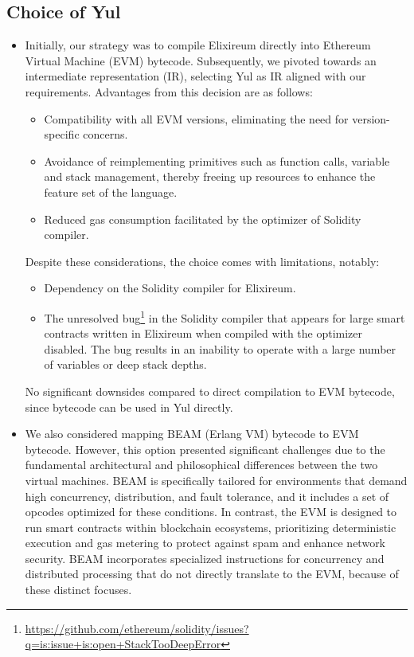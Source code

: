 \subsection{Choice of Yul}
\begin{itemize}
    \item Initially, our strategy was to compile Elixireum directly into Ethereum Virtual Machine (EVM) bytecode. Subsequently, we pivoted towards an intermediate representation (IR), selecting Yul as IR aligned with our requirements. Advantages from this decision are as follows:
        \begin{itemize}
            \item Compatibility with all EVM versions, eliminating the need for version-specific concerns. 
            \item Avoidance of reimplementing primitives such as function calls, variable and stack management, thereby freeing up resources to enhance the feature set of the language.
            \item Reduced gas consumption facilitated by the optimizer of Solidity compiler.
        \end{itemize}
      Despite these considerations, the choice comes with limitations, notably:
        \begin{itemize}
            \item Dependency on the Solidity compiler for Elixireum.
            \item The unresolved bug\footnote{\href{https://github.com/ethereum/solidity/issues?q=is:issue+is:open+StackTooDeepError}{https://github.com/ethereum/solidity/issues?q=is:issue+is:open+StackTooDeepError}} in the Solidity compiler that appears for large smart contracts written in Elixireum when compiled with the optimizer disabled. The bug results in an inability to operate with a large number of variables or deep stack depths.
        \end{itemize}
      No significant downsides compared to direct compilation to EVM bytecode, since bytecode can be used in Yul directly.

    \item We also considered mapping BEAM (Erlang VM) bytecode to EVM bytecode. However, this option presented significant challenges due to the fundamental architectural and philosophical differences between the two virtual machines. BEAM is specifically tailored for environments that demand high concurrency, distribution, and fault tolerance, and it includes a set of opcodes optimized for these conditions. In contrast, the EVM is designed to run smart contracts within blockchain ecosystems, prioritizing deterministic execution and gas metering to protect against spam and enhance network security. BEAM incorporates specialized instructions for concurrency and distributed processing that do not directly translate to the EVM, because of these distinct focuses.
\end{itemize}

